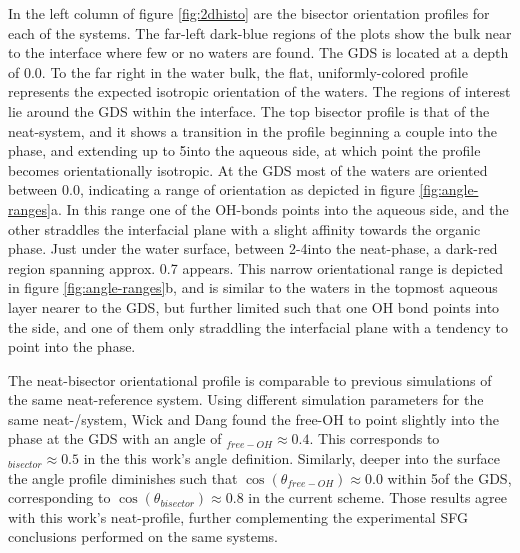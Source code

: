 In the left column of figure \ref{fig:2dhisto} are the bisector orientation profiles for each of the systems. The far-left dark-blue regions of the plots show the \ctc bulk near to the interface where few or no waters are found. The GDS is located at a depth of 0.0\angs. To the far right in the water bulk, the flat, uniformly-colored profile represents the expected isotropic orientation of the waters. The regions of interest lie around the GDS within the interface. The top bisector profile is that of the neat-\wat system, and it shows a transition in the profile beginning a couple \angs into the \ctc phase, and extending up to 5\angs into the aqueous side, at which point the profile becomes orientationally isotropic. At the GDS most of the waters are oriented between 0.0, indicating a range of orientation as depicted in figure \ref{fig:angle-ranges}a. In this range one of the OH-bonds points into the aqueous side, and the other straddles the interfacial plane with a slight affinity towards the organic \ctc phase. Just under the water surface, between 2-4\angs into the neat-\wat phase, a dark-red region spanning approx. 0.7 appears. This narrow orientational range is depicted in figure \ref{fig:angle-ranges}b, and is similar to the waters in the topmost aqueous layer nearer to the GDS, but further limited such that one OH bond points into the \wat side, and one of them only straddling the interfacial plane with a tendency to point into the \wat phase.

The neat-\wat bisector orientational profile is comparable to previous simulations of the same neat-\wat reference system. Using different simulation parameters for the same neat-\wat/\ctc system, Wick and Dang found the free-OH to point slightly into the \ctc phase at the GDS with an angle of \costheta$_{free-OH}\approx 0.4$. This corresponds to \costheta$_{bisector} \approx 0.5$ in the this work's angle definition. Similarly, deeper into the surface the angle profile diminishes such that $\cos(\theta_{free-OH})\approx 0.0$ within 5\angs of the GDS, corresponding to $\cos(\theta_{bisector})\approx 0.8$ in the current scheme. Those results agree with this work's neat-\wat profile, further complementing the experimental SFG conclusions performed on the same systems.\cite{McFearin2009,Scatena2001}


